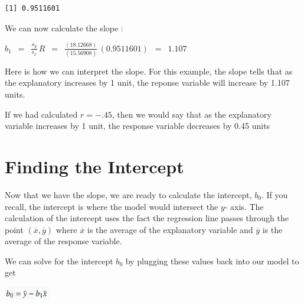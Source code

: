 \documentclass[
  letterpaper,
  DIV=11,
  numbers=noendperiod]{scrreprt}
\begin{document}
\begin{verbatim}
[1] 0.9511601
\end{verbatim}

We can now calculate the slope :

\(\displaystyle{b_1\,\,\, = \,\,\,\frac{s_y}{s_x}\, R\,\,\, =
\,\,\,\frac{(18.12668)}{(15.56908)}\,(0.9511601)\,\,\, =\,\,\, 1.107 }\)

\begin{tcolorbox}[enhanced jigsaw, colback=white, colbacktitle=quarto-callout-tip-color!10!white, toptitle=1mm, leftrule=.75mm, arc=.35mm, titlerule=0mm, toprule=.15mm, colframe=quarto-callout-tip-color-frame, left=2mm, coltitle=black, bottomtitle=1mm, title=\textcolor{quarto-callout-tip-color}{\faLightbulb}\hspace{0.5em}{Interpreting the Slope}, rightrule=.15mm, bottomrule=.15mm, breakable, opacitybacktitle=0.6, opacityback=0]

Here is how we can interpret the slope. For this example, the slope
tells that as the explanatory increases by 1 unit, the reponse variable
will increase by 1.107 units.

If we had calculated \(r = -.45\), then we would say that as the
explanatory variable increases by 1 unit, the response variable
decreases by 0.45 units

\end{tcolorbox}

\section*{Finding the Intercept}\label{finding-the-intercept}


Now that we have the slope, we are ready to calculate the intercept,
\(b_0\). If you recall, the intercept is where the model would intersect
the \(y\)- axis. The calculation of the intercept uses the fact the
regression line passes through the point
\(( \overline{x}, \overline{y})\) where \(\overline{x}\) is the average
of the explanatory variable and \(\overline{y}\) is the average of the
response variable.

We can solve for the intercept \(b_0\) by plugging these values back
into our model to get

\includegraphics[width=0.15\textwidth,height=\textheight]{./images/LMR_5.jpg}
\end{document}
